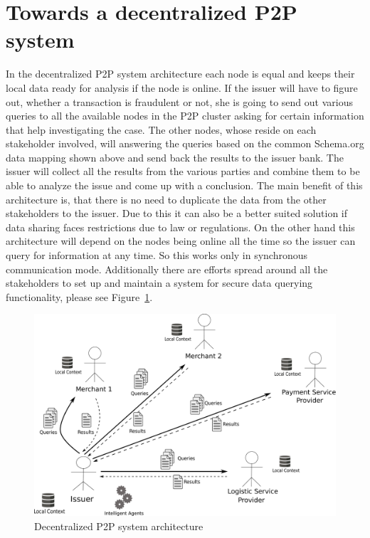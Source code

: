 \section{Towards a decentralized \gls{P2P} system}
\label{sec:p2p_decentralized_system}

In the decentralized P2P system architecture each node is equal and keeps their local data ready for analysis if the node is online. If the issuer will have to figure out, whether a transaction is fraudulent or not, she is going to send out various queries to all the available nodes in the P2P cluster asking for certain information that help investigating the case. The other nodes, whose reside on each stakeholder involved, will answering the queries based on the common Schema.org data mapping shown above and send back the results to the issuer bank. The issuer will collect all the results from the various parties and combine them to be able to analyze the issue and come up with a conclusion. The main benefit of this architecture is, that there is no need to duplicate the data from the other stakeholders to the issuer. Due to this it can also be a better suited solution if data sharing faces restrictions due to law or regulations. On the other hand this architecture will depend on the nodes being online all the time so the issuer can query for information at any time. So this works only in synchronous communication mode. Additionally there are efforts spread around all the stakeholders to set up and maintain a system for secure data querying functionality, please see Figure~\ref{fig:images_p2p_decentralized}.

\begin{figure}[H]
	\centering
		\includegraphics[width=0.9\columnwidth]{images/system_P2P_decentralized.pdf}
	\caption{Decentralized \gls{P2P} system architecture}
\label{fig:images_p2p_decentralized}
\end{figure}


